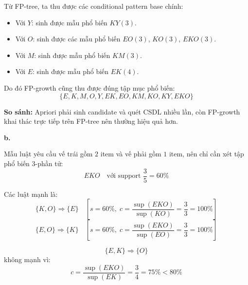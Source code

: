 Từ FP-tree, ta thu được các conditional pattern base chính:
\begin{itemize}
    \item Với $Y$: sinh được mẫu phổ biến $KY(3)$.
    \item Với $O$: sinh được các mẫu phổ biến $EO(3)$, $KO(3)$, $EKO(3)$.
    \item Với $M$: sinh được mẫu phổ biến $KM(3)$.
    \item Với $E$: sinh được mẫu phổ biến $EK(4)$.
\end{itemize}

Do đó FP-growth cũng thu được đúng tập mục phổ biến:
\[
    \{E,K,M,O,Y,EK,EO,KM,KO,KY,EKO\}
\]

\textbf{So sánh:} Apriori phải sinh candidate và quét CSDL nhiều lần, còn FP-growth khai thác trực tiếp trên FP-tree nên thường hiệu quả hơn.

\bigskip

\noindent \textbf{b.}

Mẫu luật yêu cầu vế trái gồm $2$ item và vế phải gồm $1$ item, nên chỉ cần xét tập phổ biến $3$-phần tử:
\[
    EKO \quad \text{với support } \frac{3}{5}=60\%
\]

Các luật mạnh là:
\[
    \{K,O\}\Rightarrow \{E\}
    \quad [s=60\%,\; c=\frac{\sup(EKO)}{\sup(KO)}=\frac{3}{3}=100\%]
\]
\[
    \{E,O\}\Rightarrow \{K\}
    \quad [s=60\%,\; c=\frac{\sup(EKO)}{\sup(EO)}=\frac{3}{3}=100\%]
\]

\[
    \{E,K\}\Rightarrow \{O\}
\]
không mạnh vì:
\[
    c=\frac{\sup(EKO)}{\sup(EK)}=\frac{3}{4}=75\% < 80\%
\]
